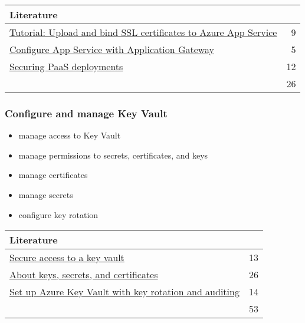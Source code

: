 \begin{tabular}{p{14cm} | r}
\textbf{Literature} & \\
\hline
\href{https://docs.microsoft.com/en-us/azure/app-service/app-service-web-tutorial-custom-ssl}{Tutorial: Upload and bind SSL certificates to Azure App Service} & 9 \\
\href{https://docs.microsoft.com/en-us/azure/application-gateway/create-web-app}{Configure App Service with Application Gateway} & 5 \\
\href{https://docs.microsoft.com/en-us/azure/security/fundamentals/paas-deployments}{Securing PaaS deployments} & 12 \\
\cline{2-2} 
 & 26 \\
\end{tabular}

\subsubsection{Configure and manage Key Vault}
\begin{itemize}
\item manage access to Key Vault 
\item manage permissions to secrets, certificates, and keys 
\item manage certificates 
\item manage secrets 
\item configure key rotation 
\end{itemize}

\begin{tabular}{p{14cm} | r}
\textbf{Literature} & \\
\hline
\href{https://docs.microsoft.com/en-us/azure/key-vault/key-vault-secure-your-key-vault}{Secure access to a key vault} & 13 \\
\href{https://docs.microsoft.com/en-us/azure/key-vault/about-keys-secrets-and-certificates}{About keys, secrets, and certificates} & 26 \\
\href{https://docs.microsoft.com/en-us/azure/key-vault/key-vault-key-rotation-log-monitoring
}{Set up Azure Key Vault with key rotation and auditing} & 14 \\
\cline{2-2} 
 & 53 \\
\end{tabular}